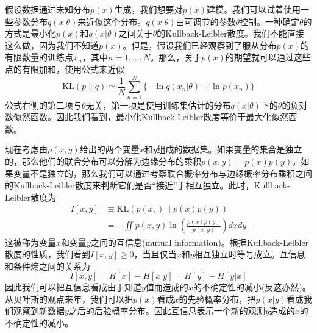 假设数据通过未知分布$p(x)$生成，我们想要对$p(x)$建模。我们可以试着使用一些参数分布$q(x|\theta)$来近似这个分布。$q(x|\theta)$由可调节的参数$\theta$控制。一种确定$\theta$的方式是最小化$p(x)$和$q(x|\theta)$之间关于$\theta$的Kullback-Leibler散度。我们不能直接这么做，因为我们不知道$p(x)$。但是，假设我们已经观察到了服从分布$p(x)$的有限数量的训练点$x_n$，其中$n=1,\dots,N$。那么，关于$p(x)$的期望就可以通过这些点的有限加和，使用公式来近似
\begin{equation}
	\mathrm{KL}(p\| q)\simeq \frac{1}{N}\sum_{n=1}^{N}\{-\ln q(x_n|\theta)+\ln p(x_n) \}
\end{equation}
公式右侧的第二项与$\theta$无关，第一项是使用训练集估计的分布$q(x|\theta)$下的$\theta$的负对数似然函数。因此我们看到，最小化Kullback-Leibler散度等价于最大化似然函数。

现在考虑由$p(x,y)$给出的两个变量$x$和$y$组成的数据集。如果变量的集合是独立的，那么他们的联合分布可以分解为边缘分布的乘积$p(x,y)=p(x)p(y)$。如果变量不是独立的，那么我们可以通过考察联合概率分布与边缘概率分布乘积之间的Kullback-Leibler散度来判断它们是否“接近”于相互独立。此时，Kullback-Leibler散度为
\begin{equation}
	\begin{aligned}
		I[x,y]&\equiv \mathrm{KL}(p(x,)\| p(x)p(y))\\
		&=-\iint p(x,y)\ln \left(\frac{p(x)p(y)}{p(x,y)}\right)dxdy
	\end{aligned}
\end{equation}
这被称为变量$x$和变量$y$之间的互信息(mutual information)。根据Kullback-Leibler散度的性质，我们看到$I[x,y]\geqslant 0$，当且仅当$x$和$y$相互独立时等号成立。互信息和条件熵之间的关系为
\begin{equation}
	I[x,y]=H[x]-H[x|y]=H[y]-H[y|x]
\end{equation}
因此我们可以把互信息看成由于知道$y$值而造成的$x$的不确定性的减小(反这亦然)。从贝叶斯的观点来年，我们可以把$p(x)$看成$x$的先验概率分布，把$p(x|y)$看成我们观察到新数据$y$之后的后验概率分布。因此互信息表示一个新的观测$y$造成的$x$的不确定性的减小。